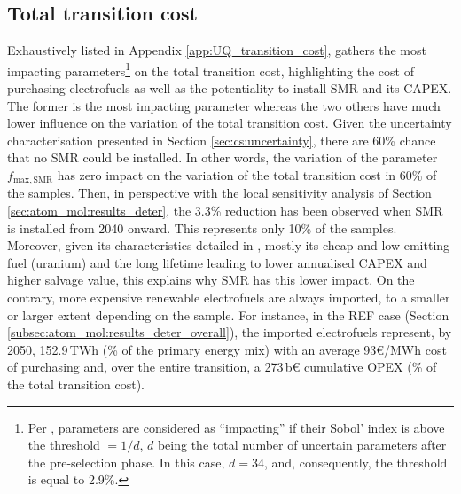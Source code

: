 \subsection{Total transition cost}
\label{subsec:atom_mol:results_uq_cost}
Exhaustively listed in Appendix \ref{app:UQ_transition_cost},  gathers the most impacting parameters\footnote{Per \citet{Turati2017}, parameters are considered as ``impacting'' if their Sobol' index is above the threshold $=1/d$, $d$ being the total number of uncertain parameters after the pre-selection phase. In this case, $d=34$, and, consequently, the threshold is equal to 2.9\%.} on the total transition cost, highlighting the cost of purchasing electrofuels as well as the potentiality to install \gls{SMR} and its CAPEX. The former is the most impacting parameter whereas the two others have much lower influence on the variation of the total transition cost. Given the uncertainty characterisation presented in Section \ref{sec:cs:uncertainty}, there are 60\% chance that no \gls{SMR} could be installed. In other words, the variation of the parameter $f_{\mathrm{max,SMR}}$ has zero impact on the variation of the total transition cost in 60\% of the samples. Then, in perspective with the local sensitivity analysis of Section \ref{sec:atom_mol:results_deter}, the 3.3\% reduction has been observed when \gls{SMR} is installed from 2040 onward. This represents only 10\% of the samples. Moreover, given its characteristics detailed in , mostly its cheap and low-emitting fuel (\ie uranium) and the long lifetime leading to lower annualised CAPEX and higher salvage value, this explains why \gls{SMR} has this lower impact. On the contrary, more expensive renewable electrofuels are always imported, to a smaller or larger extent depending on the sample. For instance, in the REF case (Section \ref{subsec:atom_mol:results_deter_overall}), the imported electrofuels represent, by 2050, 152.9\,TWh (\% of the primary energy mix) with an average 93€/MWh cost of purchasing and, over the entire transition, a 273\,b€ cumulative OPEX (\% of the total transition cost).

